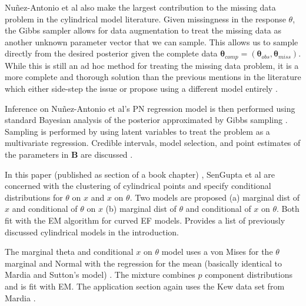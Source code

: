 Nu\~{n}ez-Antonio et al \cite{nunez-antonio_bayesian_2011} also make the largest contribution to the missing data problem in the cylindrical model literature. Given missingness in the response $\theta$, the Gibbs sampler allows for data augmentation to treat the missing data as another unknown parameter vector that we can sample. This allows us to sample directly from the desired posterior given the complete data $\bm{\theta}_{comp} = (\bm{\theta}_{obs}, \bm{\theta}_{miss})$. While this is still an ad hoc method for treating the missing data problem, it is a more complete and thorough solution than the previous mentions in the literature which either side-step the issue or propose using a different model entirely \cite{kato_dependent_2008}. 

Inference on Nu\~{n}ez-Antonio et al's PN regression model is then performed using standard Bayesian analysis of the posterior approximated by Gibbs sampling \cite{nunez-antonio_bayesian_2011}. Sampling is performed by using latent variables to treat the problem as a multivariate regression. Credible intervals, model selection, and point estimates of the parameters in $\mathbf{B}$ are discussed \cite{nunez-antonio_bayesian_2011}. 


In this paper (published as section of a book chapter) \cite{noauthor_model-based_nodate}, SenGupta et al are concerned with the clustering of cylindrical points and specify conditional distributions for $\theta$ on $x$ and $x$ on $\theta$. Two models are proposed (a) marginal dist of $x$ and conditional of $\theta$ on $x$ (b) marginal dist of $\theta$ and conditional of $x$ on $\theta$. Both fit with the EM algorithm for curved EF models. Provides a list of previously discussed cylindrical models in the introduction.  

The marginal theta and conditional $x$ on $\theta$ model uses a von Mises for the $\theta$ marginal and Normal with the regression for the mean (basically identical to Mardia and Sutton's model) \cite{mardia_model_1978}. The mixture combines $p$ component distributions and is fit with EM. The application section again uses the Kew data set from Mardia \cite{mardia_model_1978}. 